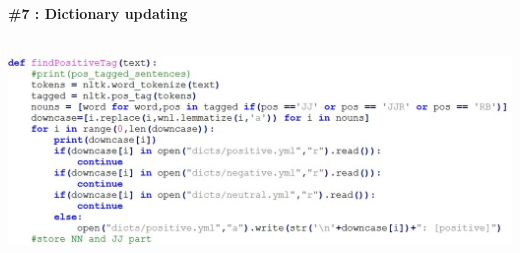 \documentclass[a4paper,12pt]{report}
\begin{document}
\begin{appendices}
\begin{center}
\end{center}
\hspace*{\parindent}\textbf{\large \#7 : Dictionary updating }
\begin{center}
	\includegraphics[height=6cm]{images/DicUpdate.jpg}
\end{center}
\end{appendices}
\newpage


\newpage
\end{document}
